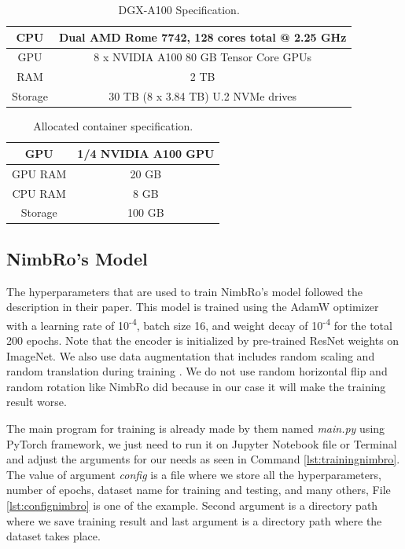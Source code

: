 \begin{longtable}{|c|c|}
  \caption{DGX-A100 Specification.}
  \label{tb:dgxa100}\\
  \hline
  CPU     & Dual AMD Rome 7742, 128 cores total @ 2.25 GHz \\
  \hline
  GPU     & 8 x NVIDIA A100 80 GB Tensor Core GPUs  \\
  \hline
  RAM     & 2 TB \\
  \hline
  Storage & 30 TB (8 x 3.84 TB) U.2 NVMe drives \\
  \hline
\end{longtable}

\begin{longtable}{|c|c|}
  \caption{Allocated container specification.}
  \label{tb:allocatedcontainer}\\
  \hline
  GPU     & 1/4 NVIDIA A100 GPU \\
  \hline
  GPU RAM & 20 GB  \\
  \hline
  CPU RAM & 8 GB \\
  \hline
  Storage & 100 GB  \\
  \hline
\end{longtable}

\subsection{NimbRo's Model}
\label{subsec:trainingnimbromodel}

The hyperparameters that are used to train NimbRo's model followed the description in their paper.
This model is trained using the AdamW optimizer with a learning rate of 10\textsuperscript{-4},
batch size 16, and weight decay of 10\textsuperscript{-4} for the total 200 epochs.
Note that the encoder is initialized by pre-trained ResNet weights on ImageNet.
We also use data augmentation that includes random scaling and random translation during training \parencite{amini2021}.
We do not use random horizontal flip and random rotation like NimbRo did because in our case it will make the training result worse.

The main program for training is already made by them named \emph{main.py} using PyTorch framework, we just need to run it on Jupyter Notebook file or Terminal and adjust the arguments for our needs
as seen in Command \ref{lst:trainingnimbro}. The value of argument \emph{config} is a file where we store all the hyperparameters, number of epochs, dataset name for training and testing, and many others, File \ref{lst:confignimbro} is one of the example.
Second argument is a directory path where we save training result and last argument is a directory path where the dataset takes place.

